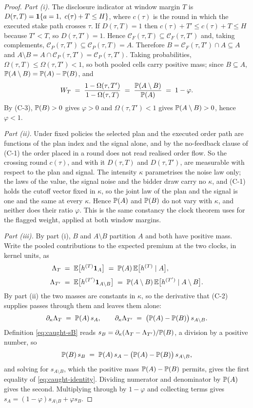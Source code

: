 \begin{proof}
\emph{Part (i).} The disclosure indicator at window margin $T$ is
$D(\tau,T) = \mathbf{1}\{a=1,\ c(\tau)+T\le H\}$, where $c(\tau)$ is the round in which the executed
stake path crosses $\tau$. If $D(\tau,T)=1$ then $c(\tau)+T' \le c(\tau)+T \le H$ because
$T'<T$, so $D(\tau,T')=1$. Hence $\mathcal{C}_F(\tau,T)\subseteq\mathcal{C}_F(\tau,T')$ and, taking
complements, $\mathcal{C}_P(\tau,T')\subseteq\mathcal{C}_P(\tau,T)=A$. Therefore
$B = \mathcal{C}_F(\tau,T')\cap A \subseteq A$ and
$A\setminus B = A\cap\mathcal{C}_P(\tau,T') = \mathcal{C}_P(\tau,T')$. Taking probabilities,
$\Omega(\tau,T) \le \Omega(\tau,T') < 1$, so both pooled cells carry positive mass; since
$B\subseteq A$, $\mathbb{P}(A\setminus B) = \mathbb{P}(A)-\mathbb{P}(B)$, and
\[
W_T \;=\; \frac{1-\Omega(\tau,T')}{1-\Omega(\tau,T)}
\;=\; \frac{\mathbb{P}(A\setminus B)}{\mathbb{P}(A)}
\;=\; 1-\varphi .
\]
By (C-3), $\mathbb{P}(B)>0$ gives $\varphi>0$ and $\Omega(\tau,T')<1$ gives $\mathbb{P}(A\setminus B)>0$, hence
$\varphi<1$.

\emph{Part (ii).} Under fixed policies the selected plan and the executed order path are functions
of the plan index and the signal alone, and by the no-feedback clause of (C-1) the order placed in
a round does not read realised order flow. So the crossing round $c(\tau)$, and with it
$D(\tau,T)$ and $D(\tau,T')$, are measurable with respect to the plan and signal. The intensity
$\kappa$ parametrises the noise law only; the laws of the value, the signal noise and the bidder
draw carry no $\kappa$, and (C-1) holds the cutoff vector fixed in $\kappa$, so the joint law of
the plan and the signal is one and the same at every $\kappa$. Hence $\mathbb{P}(A)$ and $\mathbb{P}(B)$ do not
vary with $\kappa$, and neither does their ratio $\varphi$. This is the same constancy the clock
theorem uses for the flagged weight, applied at both window margins.

\emph{Part (iii).} By part (i), $B$ and $A\setminus B$ partition $A$ and both have positive mass.
Write the pooled contributions to the expected premium at the two clocks, in kernel units, as
\[
\begin{aligned}
\Lambda_T \;&=\; \mathbb{E}\bigl[h^{(T)}\mathbf{1}_A\bigr]
  \;=\; \mathbb{P}(A)\,\mathbb{E}\bigl[h^{(T)}\mid A\bigr], \\[3pt]
\Lambda_{T'} \;&=\; \mathbb{E}\bigl[h^{(T')}\mathbf{1}_{A\setminus B}\bigr]
  \;=\; \mathbb{P}(A\setminus B)\,\mathbb{E}\bigl[h^{(T')}\mid A\setminus B\bigr] .
\end{aligned}
\]
By part (ii) the two masses are constants in $\kappa$, so the derivative that (C-2) supplies passes
through them and leaves them alone:
\[
\partial_\kappa \Lambda_T \;=\; \mathbb{P}(A)\,s_A ,
\qquad
\partial_\kappa \Lambda_{T'} \;=\; \bigl(\mathbb{P}(A)-\mathbb{P}(B)\bigr)\,s_{A\setminus B} .
\]
Definition \eqref{eq:caught-sB} reads
$s_B = \partial_\kappa(\Lambda_T - \Lambda_{T'})/\mathbb{P}(B)$, a division by a positive number, so
\[
\mathbb{P}(B)\,s_B \;=\; \mathbb{P}(A)\,s_A - \bigl(\mathbb{P}(A)-\mathbb{P}(B)\bigr)\,s_{A\setminus B} ,
\]
and solving for $s_{A\setminus B}$, which the positive mass $\mathbb{P}(A)-\mathbb{P}(B)$ permits, gives the
first equality of \eqref{eq:caught-identity}. Dividing numerator and denominator by $\mathbb{P}(A)$ gives
the second. Multiplying through by $1-\varphi$ and collecting terms gives
$s_A = (1-\varphi)s_{A\setminus B}+\varphi s_B$.


\end{proof}
